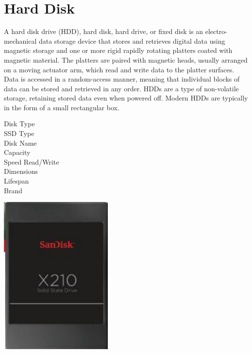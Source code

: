 \documentclass{article}
\begin{document}
\section{Hard Disk}
A hard disk drive (HDD), hard disk, hard drive, or fixed disk is an electro-mechanical data storage device that stores and retrieves digital data using magnetic storage and one or more rigid rapidly rotating platters coated with magnetic material. The platters are paired with magnetic heads, usually arranged on a moving actuator arm, which read and write data to the platter surfaces. Data is accessed in a random-access manner, meaning that individual blocks of data can be stored and retrieved in any order. HDDs are a type of non-volatile storage, retaining stored data even when powered off. Modern HDDs are typically in the form of a small rectangular box.
\begin{description}
 \item [Disk Type] 
 \item [SSD Type] 
 \item [Disk Name] 
 \item [Capacity] 
 \item [Speed Read/Write] 
 \item [Dimensions] 
 \item [Lifespan] 
 \item [Brand] 
\end{description}
\href{https://www.mouser.com/datasheet/2/669/SanDisk_DataSheet_X210_08_06_13-805929.pdf}{\includegraphics[height=8cm]{SSD.jpg}} 
\end{document}
